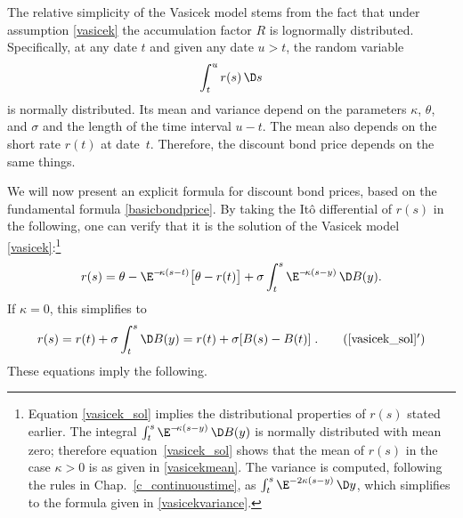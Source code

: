 The relative simplicity of the Vasicek model stems from the fact that under assumption \eqref{vasicek} the accumulation factor $R$ is lognormally distributed.  Specifically, at any date $t$ and given any date $u>t$, the random variable 
$$\int_t^u r(s)\,\D s$$
is normally distributed.  Its mean and variance depend on the parameters $\kappa$, $\theta$, and $\sigma$ and the length of the time interval $u-t$.  The mean also depends on the short rate $r(t)$ at date~$t$.  Therefore, the discount bond price depends on the same things.  

We will now present an explicit formula for discount bond prices, based on the fundamental formula \eqref{basicbondprice}.
By taking the It\^o differential of $r(s)$ in the following, one can verify that it is the solution of the Vasicek model \eqref{vasicek}:\footnote{Equation \eqref{vasicek_sol} implies the distributional properties of $r(s)$ stated earlier.
The integral $\int_t^s \E^{-\!\kappa (s-y)} \,\D B(y)$ is normally distributed with mean zero; therefore equation~\eqref{vasicek_sol} shows that the mean of $r(s)$ in the case $\kappa>0$ is as given in \eqref{vasicekmean}.  The variance is computed, following the rules in Chap.~\ref{c_continuoustime}, as $\int_t^s \E^{-2\kappa (s-y)}\,\D y$, which simplifies to the formula given in \eqref{vasicekvariance}.}
\begin{equation}\label{vasicek_sol}
r(s) =  \theta - \E^{-\!\kappa (s-t)}\big[\theta-r(t)\big]+ \sigma 
\int_t^s \E^{-\!\kappa (s-y)} \,\D B(y).
\end{equation}
If $\kappa=0$, this simplifies to
\begin{equation}\label{vasicek_sol2}
r(s) = r(t) + \sigma\int_t^s\D B(y)= r(t) + \sigma[B(s)-B(t)]\;. \tag{\ref{vasicek_sol}$'$}
\end{equation}
These equations imply the following.

